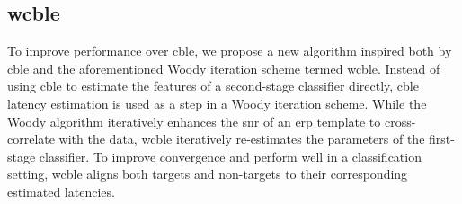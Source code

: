 \subsection{\acl{wcble}}
To improve performance over \ac{cble}, we propose a new algorithm inspired both by
\ac{cble} and the aforementioned Woody iteration scheme termed \ac{wcble}.
Instead of using \ac{cble} to estimate the features of a second-stage classifier
directly, \ac{cble} latency estimation is used as a step in a Woody iteration scheme.
While the Woody algorithm iteratively enhances the \ac{snr} of an \ac{erp} template to
cross-correlate with the data, \ac{wcble} iteratively re-estimates the parameters of
the first-stage classifier.
To improve convergence and perform well in a classification setting, \ac{wcble}
aligns both targets and non-targets to their corresponding estimated latencies.

